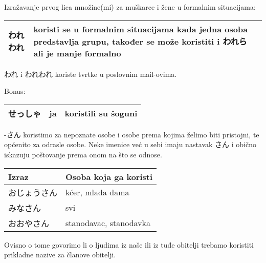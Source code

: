 	Izražavanje prvog lica množine(mi) za muškarce i žene u formalnim situacijama:
	\begin{table}[!h]
		\begin{tabular}{l p{400pt}}
			\toprule[2pt]
			われわれ&koristi se u formalnim situacijama kada jedna osoba predstavlja grupu, također se može koristiti i われら ali je manje formalno\\
			\bottomrule[2pt]
	\end{tabular}
	\end{table}


	\newpage
	
	われ i われわれ koriste tvrtke u poslovnim mail-ovima.\newline
	
	
	Bonus:
	\begin{tabular}{l l l}
		\toprule[2pt]
		せっしゃ&ja&koristili su šoguni\\
		\bottomrule[2pt]
	\end{tabular}
	

	\ten {}

	-さん	koristimo za nepoznate osobe i osobe prema kojima želimo biti pristojni, te općenito za odrasle osobe. Neke imenice već u sebi imaju nastavak さん i obično iskazuju poštovanje prema onom na što se odnose.
	
	\begin{table}[!h]	
	\begin{tabular}{l l}
		\toprule[2pt]
		Izraz&Osoba koja ga koristi\\
		\midrule
		おじょうさん&kćer, mlada dama\\
		みなさん&svi\\
		おおやさん&stanodavac, stanodavka\\
		\bottomrule[2pt]
	\end{tabular}
	\end{table}

	Ovisno o tome govorimo li o ljudima iz naše ili iz tuđe obitelji trebamo koristiti prikladne nazive za članove obitelji. 
	
